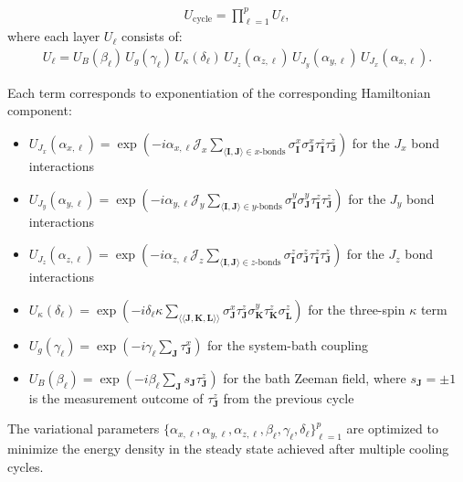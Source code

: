 \documentclass[twocolumn,
aps,
prx,
showpacs,
amsmath,
amssymb,
floatfix,
longbibliography,
superscriptaddress,
eprint]
{revtex4-1}
\begin{document}
\begin{align}
U_{\text{cycle}} = \prod_{\ell=1}^{p} U_\ell,
\end{align}
where each layer $U_\ell$ consists of:
\begin{align}
U_\ell = U_B(\beta_\ell) \, U_g(\gamma_\ell) \, U_{\kappa}(\delta_\ell) \, U_{J_z}(\alpha_{z,\ell}) \, U_{J_y}(\alpha_{y,\ell}) \, U_{J_x}(\alpha_{x,\ell}).
\label{eq:layer}
\end{align}

Each term corresponds to exponentiation of the corresponding Hamiltonian component:
\begin{itemize}
\item $U_{J_x}(\alpha_{x,\ell}) = \exp\left(-i \alpha_{x,\ell} \mathcal{J}_x \sum_{\langle \mathbf{I},\mathbf{J}\rangle\in x\text{-bonds}}\sigma_{\mathbf{I}}^{x}\sigma_{\mathbf{J}}^{x}\tau_{\mathbf{I}}^{z}\tau_{\mathbf{J}}^{z}\right)$ for the $J_x$ bond interactions
\item $U_{J_y}(\alpha_{y,\ell}) = \exp\left(-i \alpha_{y,\ell} \mathcal{J}_y \sum_{\langle \mathbf{I},\mathbf{J}\rangle\in y\text{-bonds}}\sigma_{\mathbf{I}}^{y}\sigma_{\mathbf{J}}^{y}\tau_{\mathbf{I}}^{z}\tau_{\mathbf{J}}^{z}\right)$ for the $J_y$ bond interactions  
\item $U_{J_z}(\alpha_{z,\ell}) = \exp\left(-i \alpha_{z,\ell} \mathcal{J}_z \sum_{\langle \mathbf{I},\mathbf{J}\rangle\in z\text{-bonds}}\sigma_{\mathbf{I}}^{z}\sigma_{\mathbf{J}}^{z}\tau_{\mathbf{I}}^{z}\tau_{\mathbf{J}}^{z}\right)$ for the $J_z$ bond interactions
\item $U_{\kappa}(\delta_\ell) = \exp\left(-i \delta_\ell \kappa \sum_{\langle\langle \mathbf{J},\mathbf{K},\mathbf{L}\rangle\rangle}\sigma_{\mathbf{J}}^x\tau_{\mathbf{J}}^z\sigma_{\mathbf{K}}^y\tau_{\mathbf{K}}^z\sigma_{\mathbf{L}}^z\right)$ for the three-spin $\kappa$ term
\item $U_g(\gamma_\ell) = \exp\left(-i \gamma_\ell \sum_{\mathbf{J}}\tau_{\mathbf{J}}^{x}\right)$ for the system-bath coupling
\item $U_B(\beta_\ell) = \exp\left(-i \beta_\ell \sum_{\mathbf{J}}s_{\mathbf{J}}\tau_{\mathbf{J}}^{z}\right)$ for the bath Zeeman field, where $s_{\mathbf{J}} = \pm 1$ is the measurement outcome of $\tau^z_{\mathbf{J}}$ from the previous cycle
\end{itemize}

The variational parameters $\{\alpha_{x,\ell}, \alpha_{y,\ell}, \alpha_{z,\ell}, \beta_\ell, \gamma_\ell, \delta_\ell\}_{\ell=1}^p$ are optimized to minimize the energy density in the steady state achieved after multiple cooling cycles.
\end{document}
